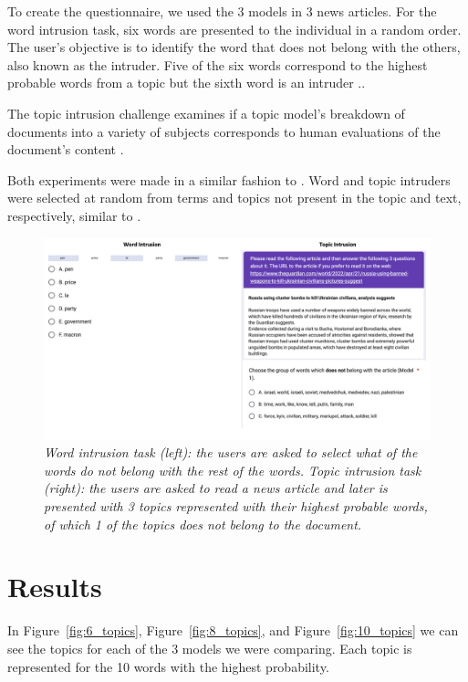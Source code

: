 \documentclass[twoside,12pt,a4paper]{article}
\begin{document}
To create the questionnaire, we used the 3 models in 3 news articles. For the word intrusion task, six words are presented to the individual in a random order.
The user's objective is to identify the word that does not belong with the others, also known as the intruder. Five of the six words correspond to the highest probable words from a topic but the sixth word is an intruder \citep{nikolenko_topic_2017}..

The topic intrusion challenge examines if a topic model's breakdown of documents into a variety of subjects corresponds to human evaluations of the document's content \citep{nikolenko_topic_2017}. 

Both experiments were made in a similar fashion to \citep{nikolenko_topic_2017, chang_reading_nodate}. Word and topic intruders were selected at random from terms and topics not present in the topic and text, respectively, similar to \citep{nikolenko_topic_2017}.

\begin{figure}[h]
\centering
\includegraphics[scale=0.35]{forms_results.png}
\caption{\textit{Word intrusion task (left): the users are asked to select what of the words do not belong with the rest of the words. Topic intrusion task (right): the users are asked to read a news article and later is presented with 3 topics represented with their highest probable words, of which 1 of the topics does not belong to the document.}}
\label{fig:forms_results}
\end{figure}

\clearpage
\section{Results}
In Figure~\ref{fig:6_topics}, Figure~\ref{fig:8_topics}, and Figure~\ref{fig:10_topics} we can see the topics for each of the 3 models we were comparing. Each topic is represented for the 10 words with the highest probability.
\end{document}
